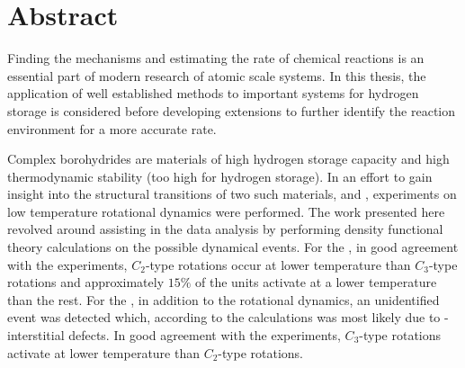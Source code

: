\chapter*{Abstract}

Finding the mechanisms and estimating the rate of chemical reactions is an essential part of modern research of atomic scale systems.
In this thesis, the application of well established methods to important systems for hydrogen storage is considered before developing extensions to further identify the reaction environment for a more accurate rate.

Complex borohydrides are materials of high hydrogen storage capacity and high thermodynamic stability (too high for hydrogen storage).
In an effort to gain insight into the structural transitions of two such materials,  and , experiments on low temperature rotational dynamics were performed.
The work presented here revolved around assisting in the data analysis by performing density functional theory calculations on the possible dynamical events.
For the , in good agreement with the experiments, $C_2$-type rotations occur at lower temperature than $C_3$-type rotations and approximately $15\%$ of the  units activate at a lower temperature than the rest.
For the , in addition to the rotational dynamics, an unidentified event was detected which, according to the calculations was most likely due to -interstitial defects.
In good agreement with the experiments, $C_3$-type rotations activate at lower temperature than $C_2$-type rotations.

